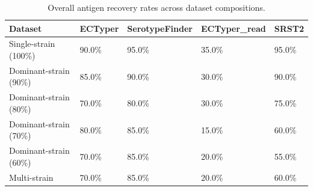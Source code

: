 \begin{table}[!ht]
\centering
\caption{Overall antigen recovery rates across dataset compositions.}
\label{tab:overall_accuracy}

\begin{tabular}{lllll}
\toprule
Dataset & ECTyper & SerotypeFinder & ECTyper_read & SRST2\\
\midrule
Single-strain (100\%) & 90.0\% & 95.0\% & 35.0\% & 95.0\%\\
Dominant-strain (90\%) & 85.0\% & 90.0\% & 30.0\% & 90.0\%\\
Dominant-strain (80\%) & 70.0\% & 80.0\% & 30.0\% & 75.0\%\\
Dominant-strain (70\%) & 80.0\% & 85.0\% & 15.0\% & 60.0\%\\
Dominant-strain (60\%) & 70.0\% & 85.0\% & 20.0\% & 55.0\%\\
\addlinespace
Multi-strain & 70.0\% & 85.0\% & 20.0\% & 60.0\%\\
\bottomrule
\end{tabular}
\end{table}
